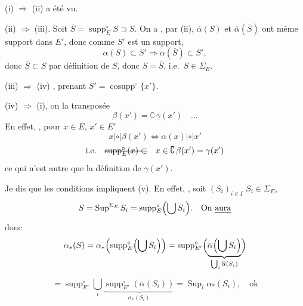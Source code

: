 \documentclass[11pt,a4paper]{article}
\begin{document}
(i) $\Longrightarrow$ (ii) a été vu.

(ii) $\Longrightarrow$ (iii).  Soit $\overline{S} = \operatorname{supp}^{\circ}_E S \supset S$. On a , par (ii), $\overline{\alpha}(S)$ et $\overline{\alpha}(\overline{S})$  ont même support dans $E'$, \struck{\ill{}} donc comme $S'$ est un support,
\[
  \overline{\alpha}(S) \subset S' \Longrightarrow \overline{\alpha}(\overline{S}) \subset S' ,
\]
donc $\overline{S} \subset S$ par définition de $S$, donc $S = \overline{S}$, i.e.\ $S \in \Sigma_E$.

(iii) $\Longrightarrow$ (iv) , prenant $S' = \operatorname{cosupp}^{\circ}\{x'\}$.

(iv) $\Longrightarrow$ (i), on  la transposée
\[
  \beta(x') = \complement\, \gamma(x') \quad \ldots
\]
En effet,   , pour $x \in E$, $x' \in E'$
\[
  x \mathrel{|\circ|} \beta(x') \iff \alpha(x) \mathrel{|\circ|} x'
\]
\[
  \text{i.e.} \quad \text{\struck{$\operatorname{supp}^{\circ}_E(x) \subset$}} \quad x \in \complement\,\beta(x') = \gamma(x')
\]
ce qui n'est autre que la définition de $\gamma(x')$.

Je dis que les conditions  impliquent (v).  En effet, \struck{\ill{}}, soit $(S_i)_{i \in I}$  $S_i \in \Sigma_E$,
\[
  S = \operatorname{Sup}^{\Sigma_E} S_i = \operatorname{supp}^{\circ}_E\Bigl(\bigcup S_i\Bigr) . \quad \text{On \uncertain{aura}}
\]
donc
\[
  \alpha_{*}(S) = \alpha_{*}\Bigl(\operatorname{supp}^{\circ}_E\Bigl(\bigcup S_i\Bigr)\Bigr)
  = \operatorname{supp}^{\circ}_{E'}\Bigl(\underbrace{\overline{\alpha}\Bigl(\bigcup S_i\Bigr)}_{\bigcup_i \overline{\alpha}(S_i)}\Bigr)
\]


\[
  = \operatorname{supp}^{\circ}_{E'} \bigcup_i \underbrace{\operatorname{supp}^{\circ}_{E'}(\overline{\alpha}(S_i))}_{\alpha_{*}(S_i)} = \operatorname{Sup}_i \alpha_{*}(S_i) , \quad \text{ok}
\]
\end{document}
